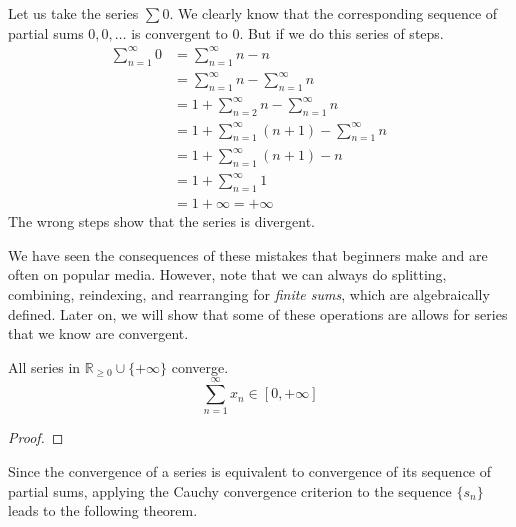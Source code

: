   \begin{example}
    \label{ex:disasters-of-reindexing-and-rearranging}
    Let us take the series $\sum 0$. We clearly know that the corresponding sequence of partial sums $0, 0, \ldots$ is convergent to $0$. But if we do this series of steps. 
    \begin{align}
      \sum_{n=1}^\infty 0 & = \sum_{n=1}^\infty n - n && \tag{Can manipulate terms} \\
                          & = \sum_{n=1}^\infty n - \sum_{n=1}^\infty n && \tag{Cannot split series} \\ 
                          & = 1 + \sum_{n=2}^\infty n - \sum_{n=1}^\infty n && \tag{Can take 1st term out} \\ 
                          & = 1 + \sum_{n=1}^\infty (n+1) - \sum_{n=1}^\infty n && \tag{Cannot reindexing} \\
                          & = 1 + \sum_{n=1}^\infty (n+1) - n  && \tag{Cannot combine series} \\
                          & = 1 + \sum_{n=1}^\infty 1 && \tag{Can manipulate terms} \\
                          & = 1 + \infty = +\infty
    \end{align}
    The wrong steps show that the series is divergent. 
  \end{example} 

  We have seen the consequences of these mistakes that beginners make and are often on popular media. However, note that we can always do splitting, combining, reindexing, and rearranging for \textit{finite sums}, which are algebraically defined. Later on, we will show that some of these operations are allows for series that we know are convergent. 

  \begin{lemma}
    \label{thm:all-series-in-extended-positive-reals-converge}
    All series in $\mathbb{R}_{\geq 0} \cup \{+\infty\}$ converge. 
    \begin{equation}
      \sum_{n=1}^\infty x_n \in [0, +\infty]
    \end{equation}
  \end{lemma}
  \begin{proof}
    
  \end{proof}

  Since the convergence of a series is equivalent to convergence of its sequence of partial sums, applying the Cauchy convergence criterion to the sequence $\{s_n\}$ leads to the following theorem. 

